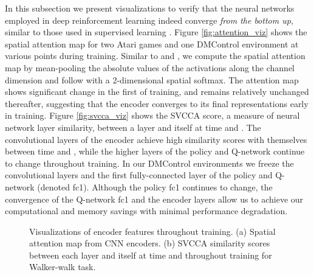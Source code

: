 \documentclass{article}
\begin{document}
In this subsection we present visualizations to verify that the neural networks employed in deep reinforcement learning indeed converge {\em from the bottom up}, similar to those used in supervised learning \citep{46337}. 
Figure \ref{fig:attention_viz} shows the spatial attention map for two Atari games and one DMControl environment at various points during training. Similar to \citet{laskin2020reinforcement} and \citet{zagoruyko2016paying}, we compute the spatial attention map by mean-pooling the absolute values of
the activations along the channel dimension and follow with a 2-dimensional spatial softmax.
The attention map shows significant change in the first  of training, and remains relatively unchanged thereafter, suggesting that the encoder converges to its final representations early in training. Figure \ref{fig:svcca_viz} shows the SVCCA \citep{46337} score, a measure of neural network layer similarity, between a layer and itself at time  and . The convolutional layers of the encoder achieve high similarity scores with themselves between time  and , while the higher layers of the policy and Q-network continue to change throughout training. In our DMControl environments we freeze the convolutional layers and the first fully-connected layer of the policy and Q-network (denoted fc1). Although the policy fc1 continues to change, the convergence of the Q-network fc1 and the encoder layers allow us to achieve our computational and memory savings with minimal performance degradation.

\begin{figure} [ht] \centering
{} 
\caption{Visualizations of encoder features throughout training. (a) Spatial attention map from CNN encoders. (b) SVCCA \citep{46337} similarity scores between each layer and itself at time  and  throughout training for Walker-walk task.} \label{fig:viz}
\end{figure}
\end{document}
